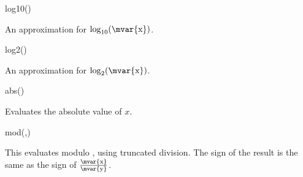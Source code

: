 \begin{math-function}{log10()}

	An approximation for $\log_{10}(\textrm{\mvar{x}})$.

\begin{codeexample}[]
 \pgfmathresult
\end{codeexample}

\end{math-function}

\begin{math-function}{log2()}

	An approximation for $\log_2(\textrm{\mvar{x}})$.

\begin{codeexample}[]
 \pgfmathresult
\end{codeexample}

\end{math-function}

\begin{math-function}{abs()} 
\mathcommand

	Evaluates the absolute value of $x$.
	
\begin{codeexample}[]
 \pgfmathresult
\end{codeexample}

\begin{codeexample}[]
 \pgfmathresult
\end{codeexample}
\end{math-function}

\begin{math-function}{mod(,)}
\mathcommand

	This evaluates  modulo , using truncated division.
	The sign of the result is the same as the sign of 
	$\frac{\textrm{\mvar{x}}}{\textrm{\mvar{y}}}$.

\begin{codeexample}[]
 \pgfmathresult
\end{codeexample}

\begin{codeexample}[]
 \pgfmathresult
\end{codeexample}

\end{math-function}

